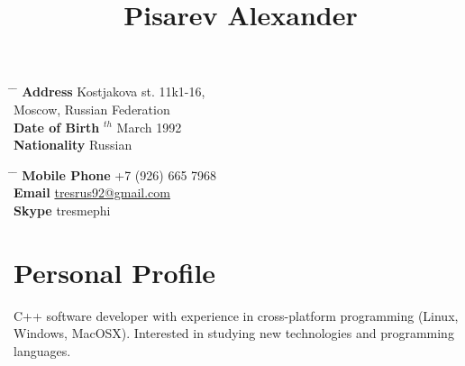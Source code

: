 \documentclass[10pt]{article} %
\begin{document}

\title{Pisarev Alexander} %


\parbox{0.5\textwidth}{ %
\begin{tabbing} %
\hspace{3cm} \= \hspace{4cm} \= \kill %
{\bf Address} \> Kostjakova st. 11k1-16,\\ %
\> Moscow, Russian Federation \\ %
{\bf Date of Birth} $^{th}$ March 1992 \\ %
{\bf Nationality} \> Russian %
\end{tabbing}}
\hfill %
\parbox{0.5\textwidth}{ %
\begin{tabbing} %
\hspace{3cm} \= \hspace{4cm} \= \kill %
{\bf Mobile Phone} \> +7 (926) 665 7968 \\ %
{\bf Email} \> \href{mailto:tresrus92@gmail.com}{tresrus92@gmail.com} \\ %
{\bf Skype} \> tresmephi \\ %
\end{tabbing}}


\section{Personal Profile}

C++ software developer with experience in cross-platform programming (Linux, Windows, MacOSX). Interested in studying new technologies and programming languages.

\end{document}
